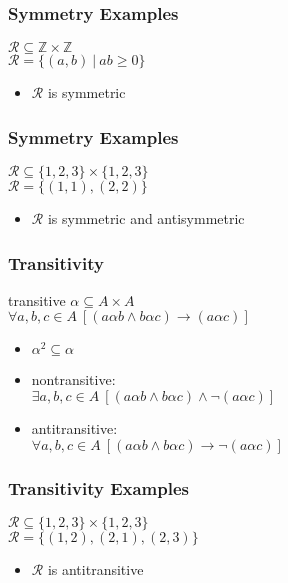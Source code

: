 \documentclass[dvipsnames]{beamer}
\begin{document}
\begin{frame}
  \frametitle{Symmetry Examples}

  $\mathcal{R} \subseteq \mathbb{Z} \times \mathbb{Z}$\\
  $\mathcal{R} = \{(a,b)~|~ab \geq 0\}$

  \medskip
  \begin{itemize}
    \item $\mathcal{R}$ is symmetric
  \end{itemize}
\end{frame}

\begin{frame}
  \frametitle{Symmetry Examples}

  $\mathcal{R} \subseteq \{1,2,3\} \times \{1,2,3\}$\\
  $\mathcal{R} = \{(1,1), (2,2)\}$

  \begin{itemize}
    \item $\mathcal{R}$ is symmetric and antisymmetric
  \end{itemize}
\end{frame}

\begin{frame}
  \frametitle{Transitivity}

  \begin{block}{transitive}
    $\alpha \subseteq A \times A$\\
    $\forall a,b,c \in A~[(a \alpha b \wedge b \alpha c) \rightarrow (a \alpha c)]$
  \end{block}

  \pause
  \begin{itemize}
    \item $\alpha^2 \subseteq \alpha$

    \pause
    \item nontransitive:\\
      $\exists a,b,c \in A~[(a \alpha b \wedge b \alpha c) \wedge \neg (a \alpha c)]$

    \pause
    \item antitransitive:\\
      $\forall a,b,c \in A~[(a \alpha b \wedge b \alpha c) \rightarrow \neg (a \alpha c)]$
  \end{itemize}
\end{frame}

\begin{frame}
  \frametitle{Transitivity Examples}

  $\mathcal{R} \subseteq \{1,2,3\} \times \{1,2,3\}$\\
  $\mathcal{R} = \{(1,2), (2,1), (2,3)\}$

  \medskip
  \begin{itemize}
    \item $\mathcal{R}$ is antitransitive
  \end{itemize}
\end{frame}
\end{document}

